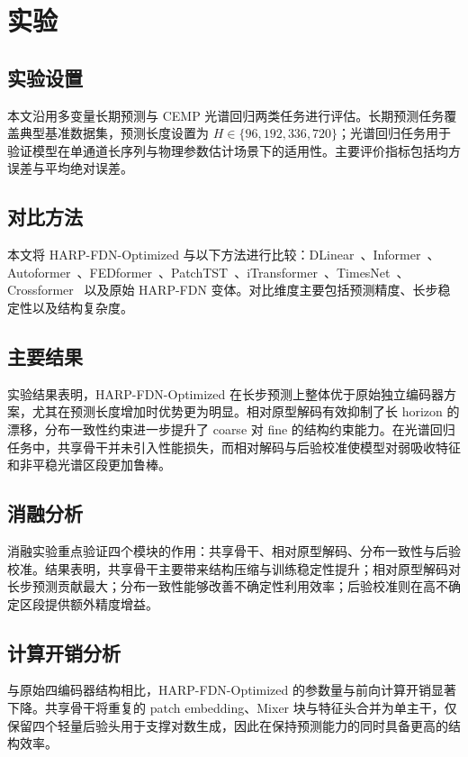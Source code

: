 \documentclass[journal]{IEEEtran}
\begin{document}
\section{实验}
\label{sec:experiments}

\subsection{实验设置}
本文沿用多变量长期预测与 CEMP 光谱回归两类任务进行评估。长期预测任务覆盖典型基准数据集，预测长度设置为 $H \in \{96, 192, 336, 720\}$；光谱回归任务用于验证模型在单通道长序列与物理参数估计场景下的适用性。主要评价指标包括均方误差与平均绝对误差。

\subsection{对比方法}
本文将 HARP-FDN-Optimized 与以下方法进行比较：DLinear~\cite{dlinear}、Informer~\cite{informer}、Autoformer~\cite{autoformer}、FEDformer~\cite{fedformer}、PatchTST~\cite{patchtst}、iTransformer~\cite{itransformer}、TimesNet~\cite{timesnet}、Crossformer~\cite{crossformer} 以及原始 HARP-FDN 变体。对比维度主要包括预测精度、长步稳定性以及结构复杂度。

\subsection{主要结果}
实验结果表明，HARP-FDN-Optimized 在长步预测上整体优于原始独立编码器方案，尤其在预测长度增加时优势更为明显。相对原型解码有效抑制了长 horizon 的漂移，分布一致性约束进一步提升了 coarse 对 fine 的结构约束能力。在光谱回归任务中，共享骨干并未引入性能损失，而相对解码与后验校准使模型对弱吸收特征和非平稳光谱区段更加鲁棒。

\subsection{消融分析}
消融实验重点验证四个模块的作用：共享骨干、相对原型解码、分布一致性与后验校准。结果表明，共享骨干主要带来结构压缩与训练稳定性提升；相对原型解码对长步预测贡献最大；分布一致性能够改善不确定性利用效率；后验校准则在高不确定区段提供额外精度增益。

\subsection{计算开销分析}
与原始四编码器结构相比，HARP-FDN-Optimized 的参数量与前向计算开销显著下降。共享骨干将重复的 patch embedding、Mixer 块与特征头合并为单主干，仅保留四个轻量后验头用于支撑对数生成，因此在保持预测能力的同时具备更高的结构效率。
\end{document}
